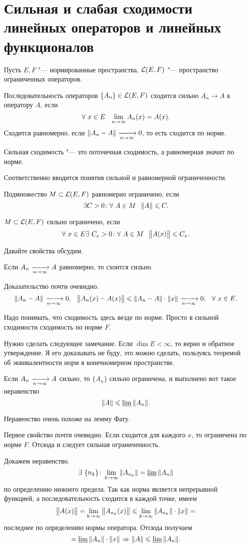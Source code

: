 \section{Сильная и слабая сходимости линейных операторов и линейных функционалов}
Пусть $E,F$ "--- нормированные пространства, $\L(E,F)$ "--- пространство ограниченных операторов.
\begin{Def}
  Последовательность операторов $\{A_n\}\in\L(E,F)$ сходится сильно $A_n\to A$ к оператору $A$, если
\[
  \forall\ x\in E\pau \yo n\infty A_n(x) = A(x).
\]
Сходится равномерно, если $\|A_n-A\|\te0$, то есть сходится по норме.
\end{Def}
Сильная сходимость "--- это поточечная сходимость, а равномерная значит по норме.

Соответственно вводится понятия сильной и равномерной ограниченности.
\begin{Def}
  Подмножество $M\subset \L(E,F)$ равномерно ограничено, если 
\[
  \exists C>0\colon\forall\ A\in M\pau  \|A\|\le C.
\]
\end{Def}
\begin{Def}
  $M\subset \L(E,F)$ сильно ограничено, если 
\[
  \forall\ x\in E\exists\ C_x>0\colon \forall\ A\in M\pau \big\|A(x)\big\|\le C_x.
\]
\end{Def}
Давайте свойства обсудим.
\begin{Ut}
  Если $A_n\te A$ равномерно, то схоится сильно.
\end{Ut}

\begin{Proof}
  Доказательство почти очевидно.
\[
  \|A_n-A\|\te0,\pau \big\|A_n(x) - A(x)\big\|\le \|A_n-A\|\cdot\|x\|\te0,\pau \forall\ x\in E.
\]
\end{Proof}
Надо понимать, что сходимость здесь везде по норме. Просто в сильной сходимости сходимость по норме $F$.

Нужно сделать следующее замечание.
Если $\dim E<\infty$, то верно и обратное утверждение. Я его доказывать не буду, это можно сделать, пользуясь теоремой об эквивалентности норм в конечномерном пространстве.

\begin{Ut}
  Если $A_n\te A$ сильно, то $\{A_n\}$ сильно ограничена, и выполнено вот такое неравенство
\[
  \|A\|\le\varliminf\|A_n\|.
\]
\end{Ut}
 Неравенство очень похоже на лемму Фату.
\begin{Proof}
  Первое свойство почти очевидно. Если сходится для каждого $x$, то ограничена по норме $F$. Отсюда и следует сильная ограниченность.

Докажем неравенство.
\[
  \exists\ \{n_k\}\colon \yo k\infty\|A_{n_k}\| = \varliminf\|A_n\|
\]
по определению нижнего предела. Так как норма является непрерывной функцией, а последовательность сходится в каждой точке, имеем
\[
  \big\|A(x)\big\| = \yo k\infty\big\|A_{n_k}(x)\big\|\le 
  \yo k\infty \|A_{n_k}\|\cdot \|x\| = 
\]
последнее по определению нормы оператора. Отсюда получаем
\[
  = \varliminf\|A_n\|\cdot \|x\| \imp \|A\|\le \varliminf \|A_n\|.
\] 
\end{Proof}

